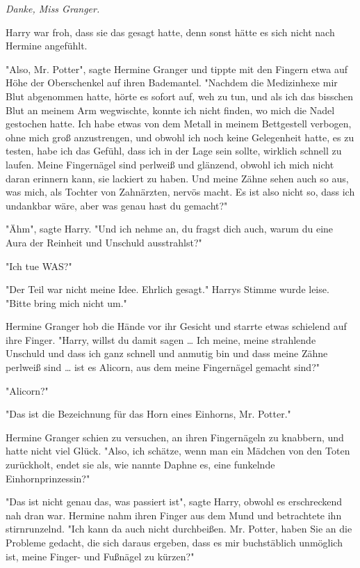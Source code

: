 {\emph{Danke, Miss Granger.}

Harry war froh, dass sie das gesagt hatte, denn sonst hätte es sich nicht nach Hermine angefühlt.

"Also, Mr. Potter", sagte Hermine Granger und tippte mit den Fingern etwa auf Höhe der Oberschenkel auf ihren Bademantel. "Nachdem die Medizinhexe mir Blut abgenommen hatte, hörte es sofort auf, weh zu tun, und als ich das bisschen Blut an meinem Arm wegwischte, konnte ich nicht finden, wo mich die Nadel gestochen hatte. Ich habe etwas von dem Metall in meinem Bettgestell verbogen, ohne mich groß anzustrengen, und obwohl ich noch keine Gelegenheit hatte, es zu testen, habe ich das Gefühl, dass ich in der Lage sein sollte, wirklich schnell zu laufen. Meine Fingernägel sind perlweiß und glänzend, obwohl ich mich nicht daran erinnern kann, sie lackiert zu haben. Und meine Zähne sehen auch so aus, was mich, als Tochter von Zahnärzten, nervös macht. Es ist also nicht so, dass ich undankbar wäre, aber was genau hast du gemacht?"

"Ähm", sagte Harry. "Und ich nehme an, du fragst dich auch, warum du eine Aura der Reinheit und Unschuld ausstrahlst?"

"Ich tue WAS?"

"Der Teil war nicht meine Idee. Ehrlich gesagt." Harrys Stimme wurde leise. "Bitte bring mich nicht um."

Hermine Granger hob die Hände vor ihr Gesicht und starrte etwas schielend auf ihre Finger. "Harry, willst du damit sagen … Ich meine, meine strahlende Unschuld und dass ich ganz schnell und anmutig bin und dass meine Zähne perlweiß sind … ist es Alicorn, aus dem meine Fingernägel gemacht sind?"

"Alicorn?"

"Das ist die Bezeichnung für das Horn eines Einhorns, Mr. Potter."

Hermine Granger schien zu versuchen, an ihren Fingernägeln zu knabbern, und hatte nicht viel Glück. "Also, ich schätze, wenn man ein Mädchen von den Toten zurückholt, endet sie als, wie nannte Daphne es, eine funkelnde Einhornprinzessin?"

"Das ist nicht genau das, was passiert ist", sagte Harry, obwohl es erschreckend nah dran war. Hermine nahm ihren Finger aus dem Mund und betrachtete ihn stirnrunzelnd. "Ich kann da auch nicht durchbeißen. Mr. Potter, haben Sie an die Probleme gedacht, die sich daraus ergeben, dass es mir buchstäblich unmöglich ist, meine Finger- und Fußnägel zu kürzen?"

}
